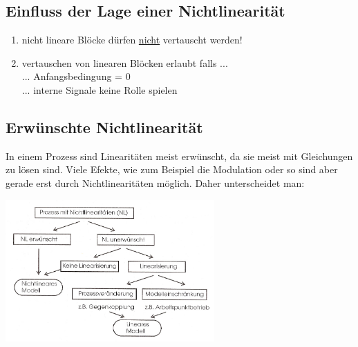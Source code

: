 	
	
	\subsection{Einfluss der Lage einer Nichtlinearität}
		\begin{enumerate}
			\item	nicht lineare Blöcke dürfen \underline{nicht} vertauscht werden!\\			
			\item vertauschen von linearen Blöcken erlaubt falls ...\\
								... Anfangsbedingung = 0\\
								... interne Signale keine Rolle spielen
		\end{enumerate}
	  	
	\subsection{Erwünschte Nichtlinearität }
		In einem Prozess sind Linearitäten meist erwünscht, da sie meist mit
		Gleichungen zu lösen sind.
		Viele Efekte, wie zum Beispiel die Modulation oder so sind aber gerade erst
		durch Nichtlinearitäten möglich. Daher unterscheidet man:\\
	\begin{minipage}[c]{8cm}
		\includegraphics[width=8cm]{./bilder/Liste_Nichtlinearitaeten.jpg}
	\end{minipage}

